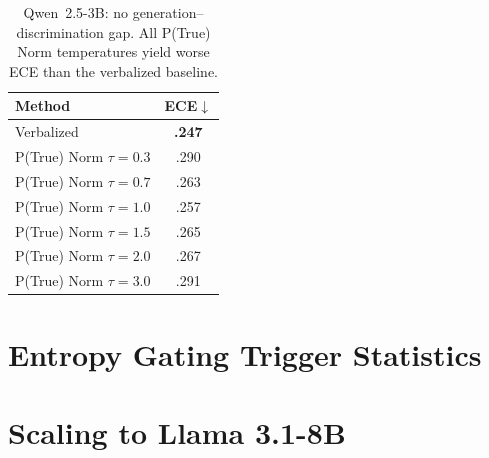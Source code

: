 \begin{table}[htbp]
\centering
\small
\begin{tabular}{lc}
\toprule
\textbf{Method} & \textbf{ECE}$\downarrow$ \\
\midrule
Verbalized & \textbf{.247} \\
\addlinespace
P(True) Norm $\tau{=}0.3$ & .290 \\
P(True) Norm $\tau{=}0.7$ & .263 \\
P(True) Norm $\tau{=}1.0$ & .257 \\
P(True) Norm $\tau{=}1.5$ & .265 \\
P(True) Norm $\tau{=}2.0$ & .267 \\
P(True) Norm $\tau{=}3.0$ & .291 \\
\bottomrule
\end{tabular}
\caption{Qwen~2.5-3B: no generation--discrimination gap.
All P(True) Norm temperatures yield worse ECE than the verbalized baseline.}
\label{tab:qwen}
\end{table}

\clearpage

\section{Entropy Gating Trigger Statistics} \label{app:ph_stats}

\begin{table}[htbp]
\centering
\small
{}%
\caption{Entropy gating trigger statistics per model.
\emph{Trained\%} is the fraction of questions receiving TTT adaptation.}
\label{tab:ph_triggers}
\end{table}

\section{Scaling to Llama 3.1-8B} \label{app:scaling_8b}

